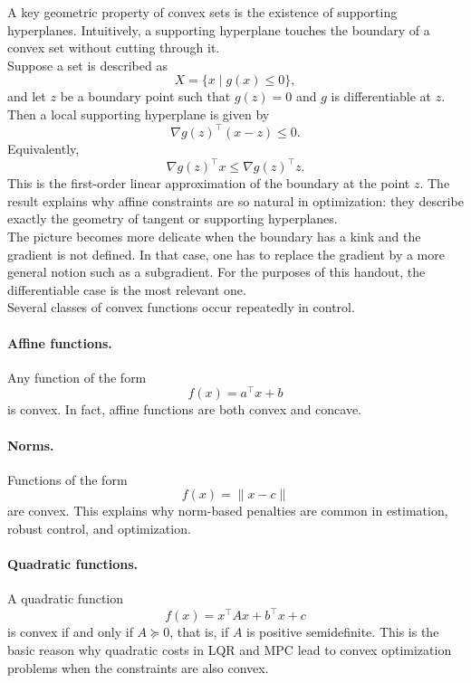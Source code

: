 A key geometric property of convex sets is the existence of supporting hyperplanes. Intuitively, a supporting hyperplane touches the boundary of a convex set without cutting through it.\\
Suppose a set is described as
$$
    X = \{x \mid g(x) \leq 0\},
$$
and let $z$ be a boundary point such that $g(z)=0$ and $g$ is differentiable at $z$. Then a local supporting hyperplane is given by
$$
    \nabla g(z)^\top (x-z) \leq 0.
$$
Equivalently,
$$
    \nabla g(z)^\top x \leq \nabla g(z)^\top z.
$$
This is the first-order linear approximation of the boundary at the point $z$. The result explains why affine constraints are so natural in optimization: they describe exactly the geometry of tangent or supporting hyperplanes.\\
The picture becomes more delicate when the boundary has a kink and the gradient is not defined. In that case, one has to replace the gradient by a more general notion such as a subgradient. For the purposes of this handout, the differentiable case is the most relevant one.\\

Several classes of convex functions occur repeatedly in control.\\
\paragraph{Affine functions.}
Any function of the form
$$
    f(x) = a^\top x + b
$$
is convex. In fact, affine functions are both convex and concave.

\paragraph{Norms.}
Functions of the form
$$
    f(x) = \|x-c\|
$$
are convex. This explains why norm-based penalties are common in estimation, robust control, and optimization.

\paragraph{Quadratic functions.}
A quadratic function
$$
    f(x) = x^\top A x + b^\top x + c
$$
is convex if and only if $A \succeq 0$, that is, if $A$ is positive semidefinite. This is the basic reason why quadratic costs in LQR and MPC lead to convex optimization problems when the constraints are also convex.

